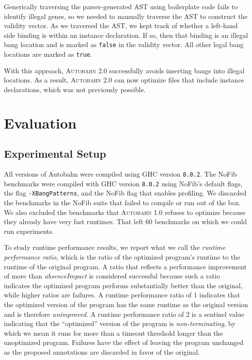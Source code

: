 \documentclass[format=sigplan, review=true, 9pt]{acmart}
\newcommand{\Ao}[0]{\textsc{Autobahn 1.0}}
\newcommand{\At}[0]{\textsc{Autobahn 2.0}}
\newcommand{\absim}[0]{\textit{absenceImpact}}
\newcommand{\nonterm}[0]{non-terminating}
\newcommand{\unimp}[0]{unimproved}
\begin{document}
Generically traversing the parser-generated AST using boilerplate code
fails to identify illegal genes, so we needed to manually traverse the AST
to construct the validity vector. As we traversed the AST, we kept
track of whether a left-hand side binding is within an instance
declaration. If so, then that binding is an illegal bang location and
is marked as \texttt{false} in the validity vector. All other
legal bang locations are marked as  \texttt{true}.

With this approach, \At{} successfully avoids inserting bangs into
illegal locations.  As a result, \At{} can now optimize files that
include instance declarations, which was not previously possible.

\section{Evaluation}

\subsection{Experimental Setup}

All versions of Autobahn were compiled using GHC
version \texttt{8.0.2}. The NoFib benchmarks were compiled with
GHC version \texttt{8.0.2} using NoFib's default flags, the flag
\texttt{-XBangPatterns}, and the NoFib flag that enables profiling. 
We discarded the benchmarks in the NoFib suite that failed to compile
or run out of the box. We also excluded the benchmarks that \Ao{}
refuses to optimize because they already have very fast runtimes. That
left 60 benchmarks on which we could run experiments.

To study runtime performance results, we report what we call
the \textit{runtime performance ratio}, which is the ratio of the
optimized program's runtime to the runtime of the original program.
A ratio that reflects a performance improvement of more than \absim{}
is considered successful
because such a ratio indicates the
optimized program performs substantially better than the original, while higher
ratios are failures.  A runtime performance ratio of 1 indicates that
the optimized version of the program has the same runtime as the
original version and is therefore \textit{\unimp{}}.  A runtime
performance ratio of 2 is a sentinel value indicating that the
``optimized'' version of the program is \textit{\nonterm{}}, by which
we mean it runs for more than a timeout threshold longer than the
unoptimized program.  Failures have the effect of leaving the program
unchanged as the proposed annotations are discarded in favor of the
original.
\end{document}

